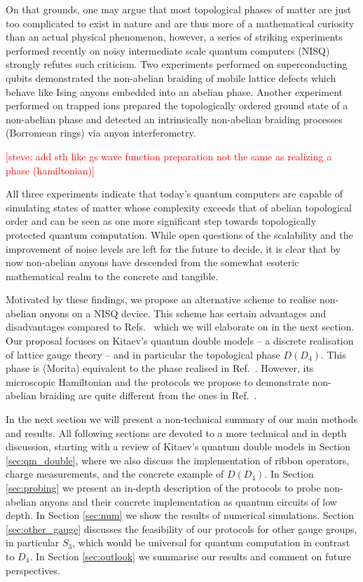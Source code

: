 \documentclass[two column]{article}
\newcommand{\caro}[1]{\textcolor{red}{[#1]}}
\begin{document}
On that grounds, one may argue that most topological phases of matter are just too complicated to exist in nature and are thus more of a mathematical curiosity than an actual physical phenomenon, however, a series of striking experiments \cite{iqbal2023creation,xu,andersen2022observation} performed recently on noisy intermediate scale quantum computers (NISQ) strongly refutes such  criticism. Two experiments performed on superconducting qubits \cite{xu,andersen2022observation} demonstrated the non-abelian braiding of mobile lattice defects which behave like Ising anyons embedded into an abelian phase. Another experiment performed on trapped ions \cite{iqbal2023creation} prepared the topologically ordered ground state of a non-abelian phase and detected an intrinsically non-abelian braiding processes (Borromean rings) via anyon interferometry. 

\caro{steve: add sth like gs wave function preparation not the same as realizing a phase (hamiltonian)}

All three experiments indicate that today's quantum computers are capable of simulating states of matter whose complexity exceeds that of abelian topological order and can be seen as one more significant step towards topologically protected quantum computation. While open questions of the scalability and the improvement of noise levels are left for the future to decide, it is clear that by now non-abelian anyons have descended from the somewhat esoteric mathematical realm to the concrete and tangible.

Motivated by these findings, we propose an alternative scheme to realise non-abelian anyons on a NISQ device. This scheme has certain advantages and disadvantages compared to Refs.~\cite{iqbal2023creation,xu,andersen2022observation} which we will elaborate on in the next section. Our proposal focuses on Kitaev's quantum double models -- a discrete realisation of lattice gauge theory -- and in particular the topological phase $D(D_4)$. This phase is (Morita) equivalent to the phase realised in Ref.~\cite{iqbal2023creation}. However, its microscopic Hamiltonian and the protocols we propose to demonstrate non-abelian braiding are quite different from the ones in Ref.~\cite{iqbal2023creation}. 

In the next section we will present a non-technical summary of our main methods and results. All following sections are devoted to a more technical and in depth discussion, starting with a review of Kitaev's quantum double models in Section \ref{sec:qm_double}, where we also discuss the implementation of ribbon operators, charge measurements, and the concrete example of $D(D_4)$. In Section \ref{sec:probing} we present an in-depth description of the protocols to probe non-abelian anyons and their concrete implementation as quantum circuits of low depth. In Section \ref{sec:num} we show the results of numerical simulations. Section \ref{sec:other_gauge} discusses the feasibility of our protocols for other gauge groups, in particular $S_3$, which would be universal for quantum computation in contrast to $D_4$. In Section \ref{sec:outlook} we summarise our results and comment on future perspectives.
\end{document}
